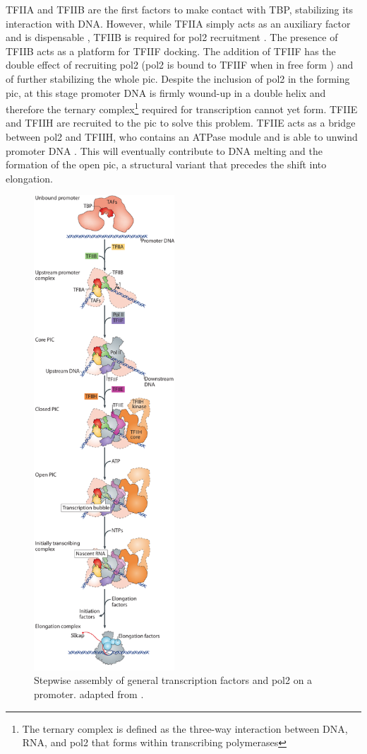 TFIIA and TFIIB are the first factors to make contact with TBP, stabilizing its interaction with DNA.
However, while TFIIA simply acts as an auxiliary factor and is dispensable \citep{imbalzano:1994:transcription}, TFIIB is required for \gls{pol2} recruitment \citep{bushnell:2004:structural}.
The presence of TFIIB  acts as a platform for TFIIF docking. 
The addition of TFIIF has the double effect of recruiting \gls{pol2}  (\gls{pol2} is bound to TFIIF when in free form \citep{rani:2004:rna}) and of further stabilizing the whole \gls{pic}. 
Despite the inclusion of \gls{pol2} in the forming \gls{pic}, at this stage promoter DNA is firmly wound-up in a double helix and therefore the ternary complex\footnote{The ternary complex is defined as the three-way interaction between DNA, RNA, and \gls{pol2} that forms within transcribing polymerases} required for transcription cannot yet form.
TFIIE and TFIIH are recruited to the \gls{pic} to solve this problem.
TFIIE acts as a bridge between \gls{pol2} and TFIIH, who contains an ATPase module and is able to unwind promoter DNA \citep{holstege:1996:opening}.
This will eventually contribute to DNA melting and the formation of the open \gls{pic}, a structural variant that precedes the shift into elongation.

\begin{figure}
\centering
\includegraphics[width=5.275cm]{figures/introduction/picAssembly} %
\caption[Stepwise PIC assembly]{
Stepwise assembly of general transcription factors and \gls{pol2} on a promoter.
adapted from \cite{sainsbury:2015:structural}.
}
\label{fig:picAssembly}
\centering
\end{figure}

